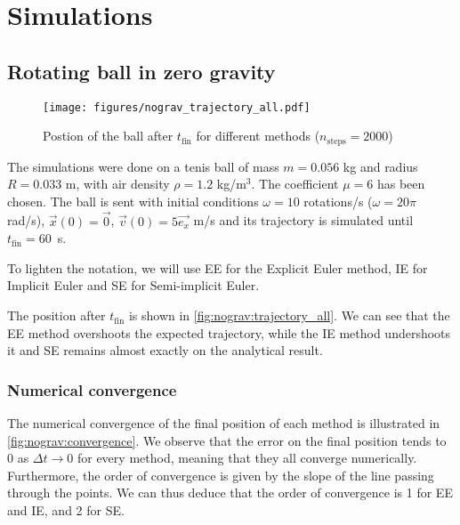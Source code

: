 \section{Simulations}

\subsection{Rotating ball in zero gravity}

\begin{wrapfigure}{R}{0.45\linewidth}
    \centering
    \texttt{[image: figures/nograv\_trajectory\_all.pdf]}
    \caption{Postion of the ball after $t_\textrm{fin}$ for different methods ($n_\textrm{steps} = 2000$)}
    \label{fig:nograv:trajectory_all}
    \vspace*{-1cm}
\end{wrapfigure}
The simulations were done on a tenis ball of mass $m = 0.056$ kg and radius $R = 0.033$ m, with air density $\rho = 1.2$ kg/m$^3$. The coefficient $\mu = 6$ has been chosen. The ball is sent with initial conditions $\omega = 10$ rotations/s ($\omega = 20\pi$ rad/s), $\vec{x}(0) = \vec{0}$, $\vec{v}(0) = 5 \vec{e_x}$ m/s and its trajectory is simulated until \mbox{$t_\textrm{fin} = 60$ s}.

To lighten the notation, we will use EE for the Explicit Euler method, IE for Implicit Euler and SE for Semi-implicit Euler.

The position after $t_\textrm{fin}$ is shown in \autoref{fig:nograv:trajectory_all}. We can see that the EE method overshoots the expected trajectory, while the IE method undershoots it and SE remains almost exactly on the analytical result.


\subsubsection{Numerical convergence}

The numerical convergence of the final position of each method is illustrated in \autoref{fig:nograv:convergence}. We observe that the error on the final position tends to 0 as $\Delta t \rightarrow 0$ for every method, meaning that they all converge numerically. Furthermore, the order of convergence is given by the slope of the line passing through the points. We can thus deduce that the order of convergence is 1 for EE and IE, and 2 for SE.

